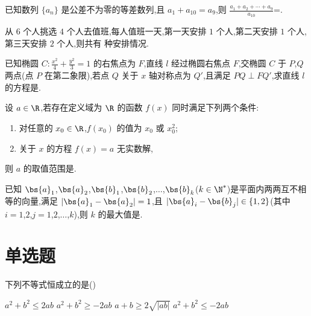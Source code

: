 \begin{problem}
已知数列 \(\{a_n\}\) 是公差不为零的等差数列,且 \(a_1+a_{10}=a_9\),则
\(\frac{a_1+a_2+\cdots+a_9}{a_{10}}\)=\fillinblank{}.
\end{problem}

\begin{problem}
从 \(6\) 个人挑选 \(4\) 个人去值班,每人值班一天,第一天安排 \(1\) 个人,第二天安排 \(1\) 个人,第三天安排 \(2\) 个人,则共有\fillinblank{} 种安排情况.
\end{problem}

\begin{problem}
已知椭圆 \(C:\frac{x^2}{4}+\frac{y^2}{3}=1\) 的右焦点为 \(F\),直线 \(l\) 经过椭圆右焦点 \(F\),交椭圆 \(C\) 于 \(P\),\(Q\) 两点(点 \(P\) 在第二象限),若点 \(Q\) 关于 \(x\) 轴对称点为 \(Q'\),且满足 \(PQ\perp FQ'\),求直线 \(l\) 的方程是\fillinblank{}.

\end{problem}

\begin{problem}
设 \(a\in\R\),若存在定义域为 \(\R\) 的函数 \(f(x)\) 同时满足下列两个条件:

\begin{enumerate}
\item 对任意的 \(x_0\in\R\),\(f(x_0)\) 的值为 \(x_0\) 或 \(x_0^2\);
\item 关于 \(x\) 的方程 \(f(x)=a\) 无实数解,
\end{enumerate}

则 \(a\) 的取值范围是\fillinblank{}.
\end{problem}

\begin{problem}
已知 \(\bs{a}_1\),\(\bs{a}_2\),\(\bs{b}_1\),\(\bs{b}_2\),\(\ldots\),\(\bs{b}_k\)(\(k\in\N^*\))是平面内两两互不相等的向量,满足 \(|\bs{a}_1-\bs{a}_2|=1\),且 \(|\bs{a}_i-\bs{b}_j|\in\{1,2\}\)(其中 \(i=1\),\(2\),\(j=1\),\(2\),\(\ldots\),\(k\)),则 \(k\) 的最大值是\fillinblank{}.

\end{problem}

\section{单选题}

\begin{problem}
下列不等式恒成立的是(\quad)

\choices
    {\(a^2+b^2\le2ab\)}
    {\(a^2+b^2\ge-2ab\)}
    {\(a+b\ge2\sqrt{|ab|}\)}
    {\(a^2+b^2\le-2ab\)}
\end{problem}

